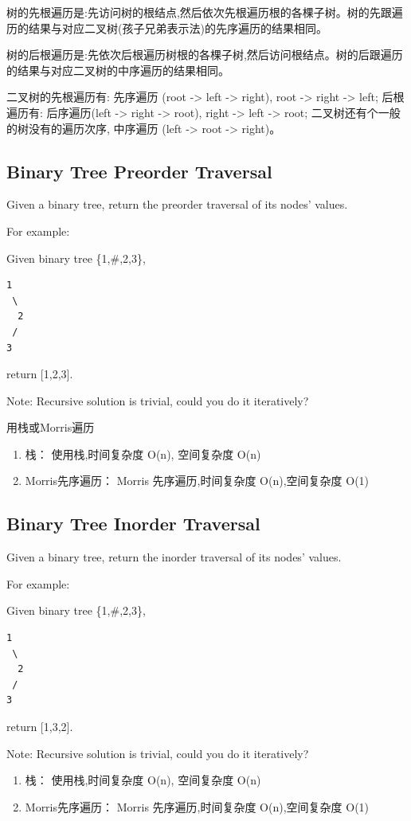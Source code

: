 \documentclass[12pt]{book}
\begin{document}
树的先根遍历是:先访问树的根结点,然后依次先根遍历根的各棵子树。树的先跟遍历的结果与对应二叉树(孩子兄弟表示法)的先序遍历的结果相同。

树的后根遍历是:先依次后根遍历树根的各棵子树,然后访问根结点。树的后跟遍历的结果与对应二叉树的中序遍历的结果相同。

二叉树的先根遍历有: 先序遍历 (root -> left -> right), root -> right -> left; 后根遍历有: 后序遍历(left -> right -> root), right -> left -> root; 二叉树还有个一般的树没有的遍历次序, 中序遍历 (left -> root -> right)。

\subsection{Binary Tree Preorder Traversal}
\label{sec-4-1-1}
Given a binary tree, return the preorder traversal of its nodes' values.

For example:

Given binary tree \{1,\#,2,3\},
\lstset{language=java,label= ,caption= ,numbers=none}
\begin{lstlisting}
1
 \
  2
 /
3
\end{lstlisting}

return [1,2,3].

Note: Recursive solution is trivial, could you do it iteratively?

用栈或Morris遍历
\begin{enumerate}
\item 栈： 使用栈,时间复杂度 O(n), 空间复杂度 O(n)
\label{sec-4-1-1-1}
\item Morris先序遍历： Morris 先序遍历,时间复杂度 O(n),空间复杂度 O(1)
\label{sec-4-1-1-2}
\end{enumerate}

\subsection{Binary Tree Inorder Traversal}
\label{sec-4-1-2}
Given a binary tree, return the inorder traversal of its nodes' values.

For example:

Given binary tree \{1,\#,2,3\},
\lstset{language=java,label= ,caption= ,numbers=none}
\begin{lstlisting}
1
 \
  2
 /
3
\end{lstlisting}

return [1,3,2].

Note: Recursive solution is trivial, could you do it iteratively?
\begin{enumerate}
\item 栈： 使用栈,时间复杂度 O(n), 空间复杂度 O(n)
\label{sec-4-1-2-1}
\item Morris先序遍历： Morris 先序遍历,时间复杂度 O(n),空间复杂度 O(1)
\label{sec-4-1-2-2}
\end{enumerate}
\end{document}
